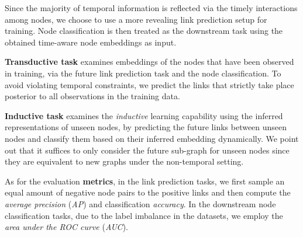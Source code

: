 \documentclass{article} %
\begin{document}
Since the majority of temporal information is reflected via the timely interactions among nodes, we choose to use a more revealing link prediction setup for training. Node classification is then treated as the downstream task using the obtained time-aware node embeddings as input.

\textbf{Transductive task} examines embeddings of the nodes that have been observed in training, via the future link prediction task and the node classification. To avoid violating temporal constraints, we predict the links that strictly take place posterior to all observations in the training data. 

\textbf{Inductive task} examines the \emph{inductive} learning capability using the inferred representations of unseen nodes, by predicting the future links between unseen nodes and classify them based on their inferred embedding dynamically. We point out that it suffices to only consider the future sub-graph for unseen nodes since they are equivalent to new graphs under the non-temporal setting.

As for the evaluation \textbf{metrics}, in the link prediction tasks, we first sample an equal amount of negative node pairs to the positive links and then compute the \emph{average precision} (\emph{AP}) and classification \emph{accuracy}. In the downstream node classification tasks, due to the label imbalance in the datasets, we employ the \emph{area under the ROC curve} (\emph{AUC}). 


\end{document}
